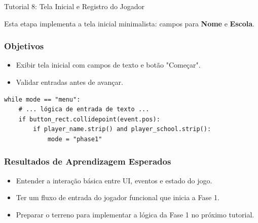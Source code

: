\documentclass[11pt,a4paper]{article}
\begin{document}
\newpage
\begin{boxTutorial}{Tutorial 8: Tela Inicial e Registro do Jogador}
\label{sec: Tutorial 8: Tela Inicial}

    Esta etapa implementa a tela inicial minimalista: campos para \textbf{Nome} e \textbf{Escola}.
    
    \subsubsection*{Objetivos}
    \begin{itemize}
    \item Exibir tela inicial com campos de texto e botão "Começar".
    \item Validar entradas antes de avançar.
    \end{itemize}
    
    \begin{verbatim}
while mode == "menu":
    # ... lógica de entrada de texto ...
    if button_rect.collidepoint(event.pos):
        if player_name.strip() and player_school.strip():
            mode = "phase1"
    \end{verbatim}
    
    \subsubsection*{Resultados de Aprendizagem Esperados}
    \begin{itemize}
    \item Entender a interação básica entre UI, eventos e estado do jogo.
    \item Ter um fluxo de entrada do jogador funcional que inicia a Fase 1.
    \item Preparar o terreno para implementar a lógica da Fase 1 no próximo tutorial.
    \end{itemize}
\end{boxTutorial}
\end{document}
